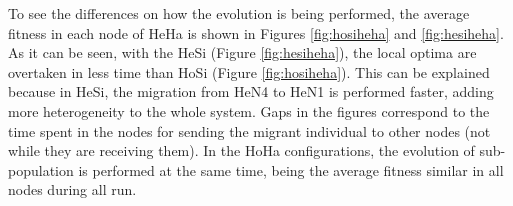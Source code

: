 \documentclass[final,1p,times]{elsarticle}
\begin{document}
\begin{table*}
\centering
\caption{Results for the MMDP problem.}
\label{tab:resultsMMDP}
\end{table*}








To see the differences on how the evolution is being performed, the average fitness in each node of HeHa is shown in Figures \ref{fig:hosiheha} and \ref{fig:hesiheha}. As it can be seen, with the HeSi (Figure \ref{fig:hesiheha}), the local optima are overtaken in less time than HoSi (Figure \ref{fig:hosiheha}).  This can be explained because in HeSi, the migration from HeN4 to HeN1 is performed faster, adding more heterogeneity to the whole system. Gaps in the figures correspond to the time spent in the nodes for sending the migrant individual to other nodes (not while they are receiving them). In the HoHa configurations, the evolution of sub-population is performed at the same time, being the average fitness similar in all nodes during all run. %
\end{document}
